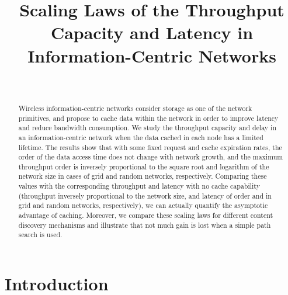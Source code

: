 \documentclass[journal]{IEEEtran}
\theoremstyle{plain}
\theoremstyle{remark}
\begin{document}
\title{Scaling Laws of the Throughput Capacity and Latency in Information-Centric Networks}

\author{\\
}


\maketitle

\begin{abstract}
Wireless information-centric networks consider storage as one of the network primitives, and propose to cache data within the network in order to improve latency and reduce bandwidth consumption. We study the throughput capacity and delay in an information-centric network when the data cached in each node has a limited lifetime. The results show that with some fixed request and cache expiration rates, the order of the data access time does not change with network growth, and the maximum throughput order is inversely proportional to the square root and logarithm of the network size  in cases of grid and random networks, respectively. Comparing these values with the corresponding throughput and latency with no cache capability (throughput inversely proportional to the network size, and latency of order  and  in grid and random networks, respectively), we can actually quantify the asymptotic advantage of caching. Moreover, we compare these scaling laws for different content discovery mechanisms and illustrate that not much gain is lost when a simple path search is used. 
\end{abstract}

\IEEEpeerreviewmaketitle

\section{Introduction}
\end{document}
